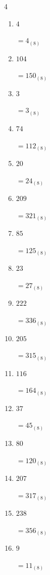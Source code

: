 \begin{multicols}{4}
\begin{enumerate}
        $=114_{(8)}$

  \item $4$

        $=4_{(8)}$

  \item $104$

        $=150_{(8)}$

  \item $3$

        $=3_{(8)}$

  \item $74$

        $=112_{(8)}$

  \item $20$

        $=24_{(8)}$

  \item $209$

        $=321_{(8)}$

  \item $85$

        $=125_{(8)}$

  \item $23$

        $=27_{(8)}$

  \item $222$

        $=336_{(8)}$

  \item $205$

        $=315_{(8)}$

\columnbreak %

  \item $116$

        $=164_{(8)}$

  \item $37$

        $=45_{(8)}$

  \item $80$

        $=120_{(8)}$

  \item $207$

        $=317_{(8)}$

  \item $238$

        $=356_{(8)}$

  \item $9$

        $=11_{(8)}$


\end{enumerate}
\end{multicols}
